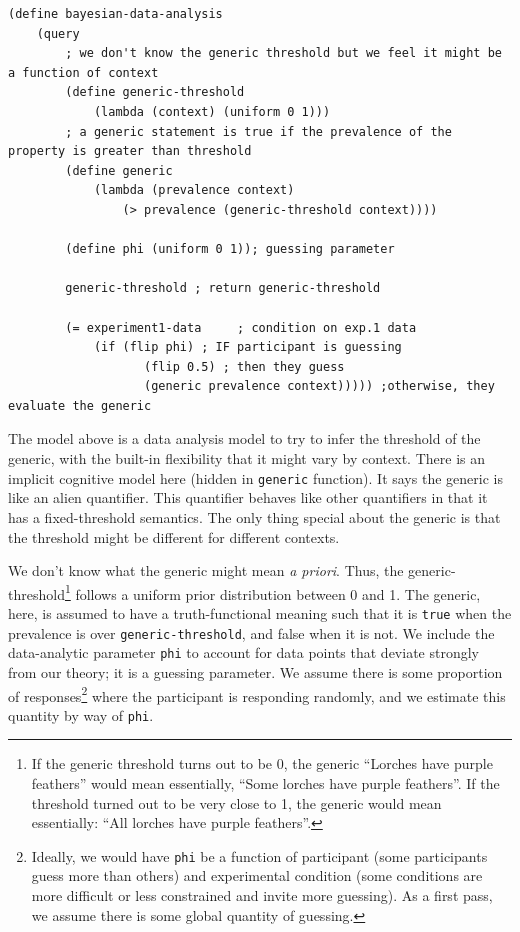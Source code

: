 \documentclass[10pt,letterpaper]{article}
\begin{document}
\begin{lstlisting}
(define bayesian-data-analysis 
	(query
		; we don't know the generic threshold but we feel it might be a function of context
		(define generic-threshold 
			(lambda (context) (uniform 0 1)))
		; a generic statement is true if the prevalence of the property is greater than threshold
		(define generic 
			(lambda (prevalence context) 
				(> prevalence (generic-threshold context))))
		
		(define phi (uniform 0 1)); guessing parameter
				
		generic-threshold ; return generic-threshold	
		
		(= experiment1-data 	; condition on exp.1 data 
			(if (flip phi) ; IF participant is guessing
				   (flip 0.5) ; then they guess
				   (generic prevalence context))))) ;otherwise, they evaluate the generic
\end{lstlisting}

The model above is a data analysis model to try to infer the threshold of the generic, with the built-in flexibility that it might vary by context. There is an implicit cognitive model here (hidden in \lstinline{generic} function). It says the generic is like an alien quantifier. This quantifier behaves like other quantifiers in that it has a fixed-threshold semantics. The only thing special about the generic is that the threshold might be different for different contexts. 

We don't know what the generic might mean \emph{a priori}. Thus, the generic-threshold\footnote{If the generic threshold turns out to be 0, the generic ``Lorches have purple feathers'' would mean essentially, ``Some lorches have purple feathers''. If the threshold turned out to be very close to 1, the generic would mean essentially: ``All lorches have purple feathers''.} follows a uniform prior distribution between 0 and 1. The generic, here, is assumed to have a truth-functional meaning such that it is \lstinline{true} when the prevalence is over \lstinline{generic-threshold}, and false when it is not. We include the data-analytic parameter \lstinline{phi} to account for data points that deviate strongly from our theory; it is a guessing parameter. We assume there is some proportion of responses\footnote{Ideally, we would have \lstinline{phi} be a function of participant (some participants guess more than others) and experimental condition (some conditions are more difficult or less constrained and invite more guessing). As a first pass, we assume there is some global quantity of guessing.} where the participant is responding randomly, and we estimate this quantity by way of \lstinline{phi}.
\end{document}
